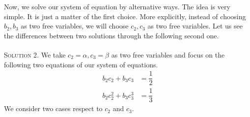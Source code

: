 \documentclass[a4paper,oneside]{book}
\numberwithin{equation}{chapter}
\begin{document}
Now, we solve our system of equation by alternative ways. The idea is very simple. It is just a matter of the first choice. More explicitly, instead of choosing $b_2,b_3$ as two free variables, we will choose $c_2,c_3$ as two free variables. Let us see the differences between two solutions through the following second one.\\
\\
\textsc{Solution 2.} We take ${c_2} = \alpha ,{c_3} = \beta $ as two free variables and focus on the following two equations of our system of equations.
\begin{align}
{b_2}{c_2} + {b_3}{c_3} &= \dfrac{1}{2}\label{3.128}\\
{b_2}c_2^2 + {b_3}c_3^3 &= \dfrac{1}{3}\label{3.129}
\end{align}
We consider two cases respect to $c_2$ and $c_3$.
\end{document}
